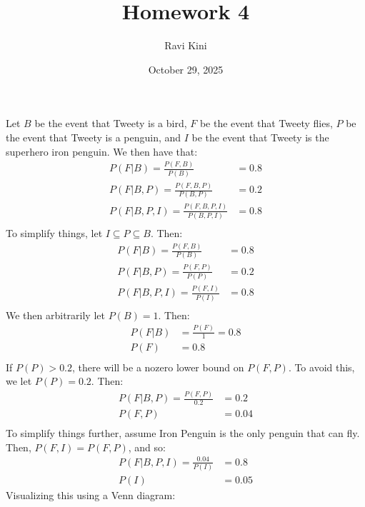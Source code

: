 \documentclass{article}
\title{Homework 4}
\author{Ravi Kini}
\date{October 29, 2025}
\begin{document}
\maketitle

\problem{}
Let $B$ be the event that Tweety is a bird, $F$ be the event that Tweety flies, $P$ be the event that Tweety is a penguin, and $I$ be the event that Tweety is the superhero iron penguin. We then have that:
\begin{align*}
    P(F|B) = \frac{P(F, B)}{P(B)} & = 0.8 \\
    P(F|B, P) = \frac{P(F, B, P)}{P(B, P)} & = 0.2 \\
    P(F|B, P, I) = \frac{P(F, B, P, I)}{P(B, P, I)} & = 0.8 \\
\end{align*}
To simplify things, let $I \subseteq P \subseteq B$. Then:
\begin{align*}
    P(F|B) = \frac{P(F, B)}{P(B)} & = 0.8 \\
    P(F|B, P) = \frac{P(F, P)}{P(P)} & = 0.2 \\
    P(F|B, P, I) = \frac{P(F, I)}{P(I)} & = 0.8 \\
\end{align*}
We then arbitrarily let $P(B) = 1$. Then:
\begin{align*}
    P(F|B) & = \frac{P(F)}{1} = 0.8 \\
    P(F) & = 0.8 \\
\end{align*}
If $P(P) > 0.2$, there will be a nozero lower bound on $P(F, P)$. To avoid this, we let $P(P) = 0.2$. Then:
\begin{align*}
    P(F|B, P) = \frac{P(F, P)}{0.2} & = 0.2 \\
    P(F, P) & = 0.04 \\
\end{align*}
To simplify things further, assume Iron Penguin is the only penguin that can fly. Then, $P(F, I) = P(F, P)$, and so:
\begin{align*}
    P(F|B, P, I) = \frac{0.04}{P(I)} & = 0.8 \\
    P(I) & = 0.05
\end{align*}
Visualizing this using a Venn diagram:
\begin{center}
\end{center}
\end{document}
